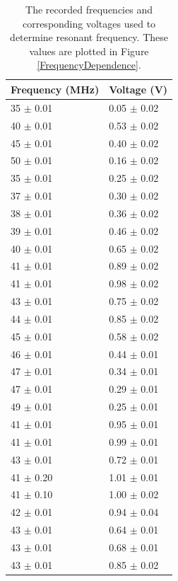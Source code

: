 \documentclass[a4paper]{article}
\begin{document}
\begin{table}[H]
  \caption{The recorded frequencies and corresponding voltages used to determine
    resonant frequency. These values are plotted in Figure
    \ref{FrequencyDependence}.}
  \begin{center}
    \begin{tabular}{|l|l|}
      \hline
      Frequency (\si{\mega\hertz}) & Voltage (\si{\volt}) \\
      \hline
      35 \( \pm \) 0.01 & 0.05  \( \pm \) 0.02 \\
      40 \( \pm \) 0.01 & 0.53  \( \pm \) 0.02 \\
      45 \( \pm \) 0.01 & 0.40  \( \pm \) 0.02 \\
      50 \( \pm \) 0.01 & 0.16  \( \pm \) 0.02 \\
      35 \( \pm \) 0.01 & 0.25  \( \pm \) 0.02 \\
      37 \( \pm \) 0.01 & 0.30  \( \pm \) 0.02 \\
      38 \( \pm \) 0.01 & 0.36  \( \pm \) 0.02 \\
      39 \( \pm \) 0.01 & 0.46  \( \pm \) 0.02 \\
      40 \( \pm \) 0.01 & 0.65  \( \pm \) 0.02 \\
      41 \( \pm \) 0.01 & 0.89  \( \pm \) 0.02 \\
      41 \( \pm \) 0.01 & 0.98  \( \pm \) 0.02 \\
      43 \( \pm \) 0.01 & 0.75  \( \pm \) 0.02 \\
      44 \( \pm \) 0.01 & 0.85  \( \pm \) 0.02 \\
      45 \( \pm \) 0.01 & 0.58  \( \pm \) 0.02 \\
      46 \( \pm \) 0.01 & 0.44  \( \pm \) 0.01 \\
      47 \( \pm \) 0.01 & 0.34  \( \pm \) 0.01 \\
      47 \( \pm \) 0.01 & 0.29  \( \pm \) 0.01 \\
      49 \( \pm \) 0.01 & 0.25  \( \pm \) 0.01 \\
      41 \( \pm \) 0.01 & 0.95  \( \pm \) 0.01 \\
      41 \( \pm \) 0.01 & 0.99  \( \pm \) 0.01 \\
      43 \( \pm \) 0.01 & 0.72  \( \pm \) 0.01 \\
      41 \( \pm \) 0.20 & 1.01  \( \pm \) 0.01 \\
      41 \( \pm \) 0.10 & 1.00  \( \pm \) 0.02 \\
      42 \( \pm \) 0.01 & 0.94  \( \pm \) 0.04 \\
      43 \( \pm \) 0.01 & 0.64  \( \pm \) 0.01 \\
      43 \( \pm \) 0.01 & 0.68  \( \pm \) 0.01 \\
      43 \( \pm \) 0.01 & 0.85  \( \pm \) 0.02 \\
      \hline
    \end{tabular}
  \end{center}
  \label{tab:freqVolt}
\end{table}
\end{document}
